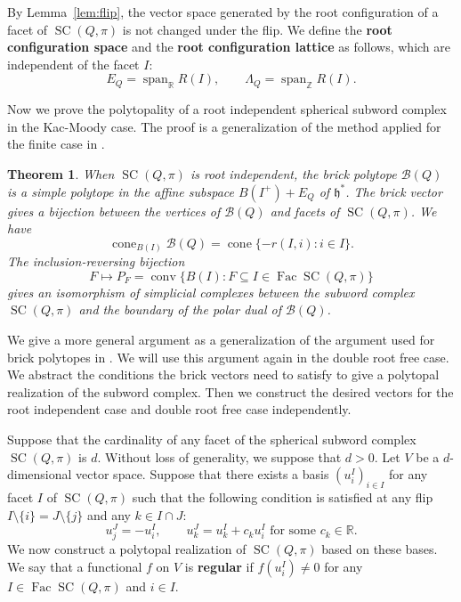 \documentclass[11pt,a4paper]{article}
\newtheorem{theorem}{Theorem}[section]
\theoremstyle{definition}
\theoremstyle{remark}
\newcommand{\R}{\mathbb R}
\newcommand{\SC}{\operatorname{SC}}
\newcommand{\cone}{\operatorname{cone}}
\newcommand{\conv}{\operatorname{conv}}
\newcommand{\Span}{\operatorname{span}}
\newcommand{\Fac}{\operatorname{Fac}}
\numberwithin{equation}{section}
\newcommand{\Z}{\mathbb Z}
\begin{document}
By Lemma~\ref{lem:flip}, the vector space generated by the root configuration of a facet of $\SC(Q,\pi)$ is not changed under the flip. We define the \textbf{root configuration space} and the \textbf{root configuration lattice} as follows, which are independent of the facet $I$:
\[
E_Q=\Span_{\R}R(I),\qquad \Lambda_Q=\Span_{\Z}R(I).
\]

Now we prove the polytopality of a root independent spherical subword complex in the Kac-Moody case. The proof is a generalization of the method applied for the finite case in \cite{JS}.
\begin{theorem}\label{thm:km-ri}
When $\SC(Q,\pi)$ is root independent, the brick polytope $\mathcal B(Q)$ is a simple polytope in the affine subspace
$B(I^+)+E_Q$ of $\mathfrak h^*$. The brick vector gives a bijection between the vertices of $\mathcal B(Q)$ and facets of $\SC(Q,\pi)$. We have
\begin{equation}\label{eq:km-tangent}
\cone_{B(I)}\mathcal B(Q)=\cone\{-r(I,i):i\in I\}.
\end{equation}
The inclusion-reversing bijection
\begin{equation}\label{eq:km-faces}
F\longmapsto P_F=\conv\{B(I):F\subseteq I\in\Fac\SC (Q,\pi)\}
\end{equation}
gives an isomorphism of simplicial complexes between the subword complex $\SC (Q,\pi)$ and the boundary of the polar dual of $\mathcal B(Q)$.
\end{theorem}

We give a more general argument as a generalization of the argument used for brick polytopes in \cite{PSbrick,JS}. We will use this argument again in the double root free case.
We abstract the conditions the brick vectors need to satisfy to give a polytopal realization of the subword complex. Then we construct the desired vectors for the root independent case and double root free case independently.

Suppose that the cardinality of any facet of the spherical subword complex $\SC(Q,\pi)$ is $d$. Without loss of generality, we suppose that $d>0$. Let $V$ be a $d$-dimensional vector space. Suppose that there exists a basis $(u^I_i)_{i\in I}$ for any facet $I$ of $\SC(Q,\pi)$ such that the following condition is satisfied
at any flip $I\setminus\{i\}=J\setminus\{j\}$ and any $k\in I\cap J$:
\begin{equation}\label{eq:abstract-transport}
u_j^J=-u_i^I,\qquad
u_k^J=u_k^I+c_k u_i^I \text{ for some } c_k\in \mathbb{R} .
\end{equation}
We now construct a polytopal realization of $\SC(Q,\pi)$ based on these bases.
We say that a functional $f$ on $V$ is \textbf{regular} if $f(u^I_i)\neq 0$ for any $I\in \Fac\SC(Q,\pi)$ and $i\in I$.
\end{document}
